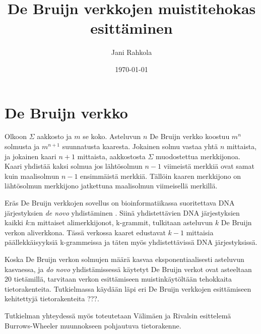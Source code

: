 \documentclass[finnish]{tktltiki2}
\title{De Bruijn verkkojen muistitehokas esittäminen}
\author{Jani Rahkola}
\date{\today}
\theoremstyle{definition}
\theoremstyle{remark}
\begin{document}

\frontmatter      %

\maketitle        %


\mainmatter       %

\section{De Bruijn verkko}

Olkoon \(\Sigma\) aakkosto ja \(m\) se koko. Asteluvun \(n\) De Bruijn verkko
koostuu \(m^n\) solmusta ja \(m^{n+1}\) suunnatusta kaaresta. Jokainen solmu
vastaa yhtä \(n\) mittaista, ja jokainen kaari \(n + 1\) mittaista,
aakkostosta \(\Sigma\) muodostettua merkkijonoa. Kaari yhdistää kaksi solmua
jos lähtösolmun \(n - 1\) viimeistä merkkiä ovat samat kuin maalisolmun \(n -
1\) ensimmäistä merkkiä. Tällöin kaaren merkkijono on lähtösolmun merkkijono
jatkettuna maalisolmun viimeisellä merkillä.

Eräs De Bruijn verkkojen sovellus on bioinformatiikassa suoritettava DNA
järjestyksien \textit{de novo} yhdistäminen \cite{iduryramanawaterman1995}.
Siinä yhdistettävien DNA järjestyksien kaikki \(k\):n mittaiset
alimerkkijonot, k-grammit, tulkitaan asteluvun \(k\) De Bruijn verkon
aliverkkona. Tässä verkossa kaaret edustavat \(k - 1\) mittaisia
päällekkäisyyksiä k-grammeissa ja täten myös yhdistettävissä DNA
järjestyksissä.

Koska De Bruijn verkon solmujen määrä kasvaa eksponentiaalisesti asteluvun
kasvaessa, ja \textit{do novo} yhdistämissessä käytetyt De Bruijn verkot ovat
asteeltaan 20 tietämillä, tarvitaan verkon esittämiseen muistinkäytöltään
tehokkaita tietorakenteita. Tutkielmassa käydään läpi eri De Bruijn verkkojen
esittämiseen kehitettyjä tietorakenteita ???.

Tutkielman yhteydessä myös toteutetaan Välimäen ja Rivalsin
\cite{rivalvalimaki2013} esittelemä Burrows-Wheeler muunnokseen pohjautuva
tietorakenne.

%
%
% 
%







%
\end{document}
